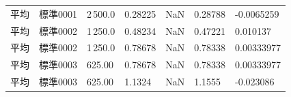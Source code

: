 \documentclass[UTF8,10pt,a4paper,fontset=fandol]{ctexart}
\newcommand{\fieldvalue}[1]{#1}
\begin{document}
\begin{center}
\begin{center}
\begin{tabularx}{\textwidth}{l l l l l l l}
平均 &
\fieldvalue{標準0001} &
\fieldvalue{2\,500.0} &
\fieldvalue{0.28225} &
\fieldvalue{NaN} &
\fieldvalue{0.28788} &
\fieldvalue{-0.0065259} \\

平均 &
\fieldvalue{標準0002} &
\fieldvalue{1\,250.0} &
\fieldvalue{0.48234} &
\fieldvalue{NaN} &
\fieldvalue{0.47221} &
\fieldvalue{0.010137} \\

平均 &
\fieldvalue{標準0002} &
\fieldvalue{1\,250.0} &
\fieldvalue{0.78678} &
\fieldvalue{NaN} &
\fieldvalue{0.78338} &
\fieldvalue{0.00333977} \\

平均 &
\fieldvalue{標準0003} &
\fieldvalue{625.00} &
\fieldvalue{0.78678} &
\fieldvalue{NaN} &
\fieldvalue{0.78338} &
\fieldvalue{0.00333977} \\

平均 &
\fieldvalue{標準0003} &
\fieldvalue{625.00} &
\fieldvalue{1.1324} &
\fieldvalue{NaN} &
\fieldvalue{1.1555} &
\fieldvalue{-0.023086} \\


\end{tabularx}
\end{center}
\end{center}
\end{document}
